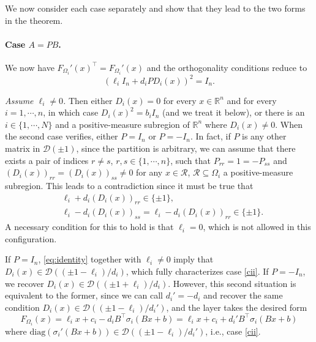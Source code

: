 \documentclass{article}
\theoremstyle{plain}
\theoremstyle{definition}
\theoremstyle{definition}
\theoremstyle{remark}
\theoremstyle{definition}
\theoremstyle{definition}
\theoremstyle{remark}
\numberwithin{equation}{section}
\begin{document}
We now consider each case separately and show that they lead to the two forms in the theorem.

\paragraph{Case $A=PB$.} We now have $F_{\Omega_i}'(x)^\top = F_{\Omega_i}'(x)$ and the orthogonality conditions reduce to
\begin{equation}\label{eq:identity}
\left(\ell_i I_n + d_i PD_i(x)\right)^2 %
= I_n.
\end{equation}

\textit{Assume $\ell_i\neq 0$.} Then either $D_i(x)=0$ for every $x\in\mathbb{R}^n$ and for every $i=1,\cdots,n$, in which case $D_i(x)^2 = b_i I_n$ (and we treat it below), or there is an $i\in\{1,\cdots,N\}$ and a positive-measure subregion of $\mathbb{R}^n$ where $D_i(x)\neq 0$. When the second case verifies, either $P=I_n$ or $P=-I_n$. In fact, if $P$ is any other matrix in $\mathcal{D}(\pm 1)$, since the partition is arbitrary, we can assume that there exists a pair of indices $r\neq s$, $r,s\in\{1,\cdots,n\}$, such that $P_{rr}=1=-P_{ss}$ and $(D_i(x))_{rr}=(D_i(x))_{ss}\neq 0$ for any $x\in\mathcal{R}$, $\mathcal{R}\subseteq\Omega_i$ a positive-measure subregion. This leads to a contradiction since it must be true that
\[
\begin{aligned}
& \ell_i + d_i(D_i(x))_{rr}\in\{\pm 1\},\\
& \ell_i - d_i(D_i(x))_{ss}=\ell_i - d_i(D_i(x))_{rr}\in\{\pm 1\}.
\end{aligned}
\]
A necessary condition for this to hold is that $\ell_i=0$, which is not allowed in this configuration. 

If $P=I_n$, \eqref{eq:identity} together with $\ell_i\neq 0$ imply that $D_i(x)\in \mathcal{D}((\pm 1 - \ell_i)/d_i)$, which fully characterizes case \ref{cii}. If $P=-I_n$, we recover $D_i(x)\in\mathcal{D}((\pm 1+\ell_i)/d_i)$. However, this second situation is equivalent to the former, since we can call $d_i' = -d_i$ and recover the same condition $D_i(x)\in\mathcal{D}((\pm 1-\ell_i)/d_i')$, and the layer takes the desired form 
\[
F_{\Omega_i}(x) = \ell_ix+c_i - d_i B^\top \sigma_i(Bx+b)= \ell_ix+c_i+d_i'B^\top \sigma_i(Bx+b)
\]
where $\mathrm{diag}(\sigma_i'(Bx+b))\in\mathcal{D}((\pm 1-\ell_i)/d_i')$, i.e., case \ref{cii}.
\end{document}
